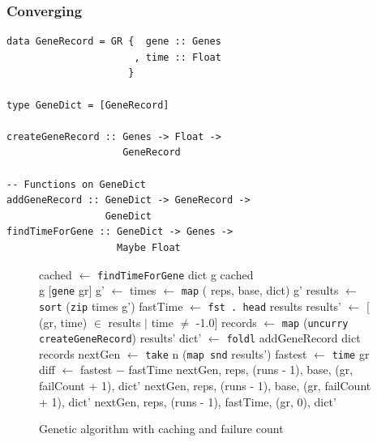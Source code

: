 \documentclass[preprint,nocopyrightspace]{sigplanconf}
\begin{document}
\subsubsection{Converging}
\begin{lstlisting}[float,frame=single,caption=Datatypes for improved genetic algorithm,label=lst:improved]
data GeneRecord = GR {  gene :: Genes
                      , time :: Float
                     }

type GeneDict = [GeneRecord]

createGeneRecord :: Genes -> Float -> 
                    GeneRecord

-- Functions on GeneDict
addGeneRecord :: GeneDict -> GeneRecord -> 
                 GeneDict
findTimeForGene :: GeneDict -> Genes -> 
                   Maybe Float
\end{lstlisting}
\begin{figure}[t]
\begin{algorithmic}

\State cached $\gets$ \lstinline!findTimeForGene! dict g
\State\Return{}
\EndIf
\State\Return cached
\EndFunction\\

 \State\Return g
 \State\Return $[$\lstinline!gene! gr$]$
\EndIf
\State g' $\gets$ 
\State times $\gets$ \lstinline!map! ( {reps, base, dict}) g'
\State results $\gets$ \lstinline!sort! (\lstinline!zip! times g')
\State fastTime $\gets$ \lstinline!fst . head! results
\State results' $\gets$ $[$(gr, time) $\in$ results $\mid$ time $\not=$ -1.0$]$
\State records $\gets$ \lstinline!map! (\lstinline!uncurry createGeneRecord!) results'
\State dict' $\gets$ \lstinline!foldl! addGeneRecord dict records
\State nextGen $\gets$ \lstinline!take! n (\lstinline!map snd! results')
\State\Return{}
\EndIf
\State fastest $\gets$ \lstinline!time! gr
\State diff $\gets$ fastest $-$ fastTime
 \State\Return{} {nextGen, reps, (runs - 1), base, (gr, failCount + 1), dict'}
 \State\Return{} {nextGen, reps, (runs - 1), base, (gr, failCount + 1), dict'}
\Else \State\Return{} {nextGen, reps, (runs - 1), fastTime, (gr, 0), dict'}
\EndIf

\EndFunction
\end{algorithmic}
\caption{Genetic algorithm with caching and failure count}
\label{alg:converge}
\end{figure}
\end{document}
